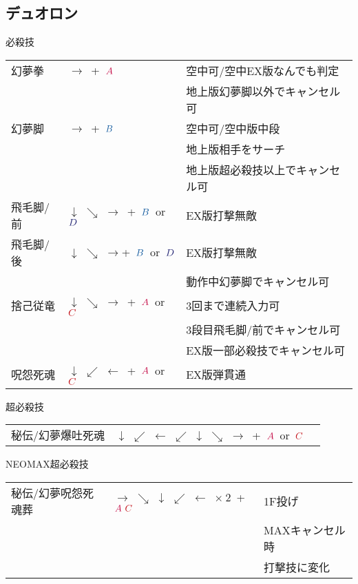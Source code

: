 \documentclass[a4j,11pt]{jarticle}
\def\A{\textcolor{Acolor}{A}}
\def\C{\textcolor{Ccolor}{C}}
\def\B{\textcolor{Bcolor}{B}}
\def\D{\textcolor{Dcolor}{D}}
\def\hado{$\downarrow$ $\searrow$ $\rightarrow$}%
\def\tatsu{$\downarrow$ $\swarrow$ $\leftarrow$}%
\def\gyakuyoga{$\rightarrow$ $\searrow$ $\downarrow$ $\swarrow$ $\leftarrow$}%
\def\orochi{$\downarrow$ $\swarrow$ $\leftarrow$ $\swarrow$ $\downarrow$ $\searrow$ $\rightarrow$}%
\begin{document}
\subsection{デュオロン}
\begin{itembox}[l]{必殺技}
\begin{tabular}{lll}
幻夢拳&$\rightarrow$\ +\ $\A$&空中可/空中EX版なんでも判定\\%
&&地上版幻夢脚以外でキャンセル可\\
幻夢脚&$\rightarrow$\ +\ $\B$&空中可/空中版中段\\%
&&地上版相手をサーチ\\
&&地上版超必殺技以上でキャンセル可\\
飛毛脚/前&\hado\ +\ $\B$\ or\ $\D$&EX版打撃無敵\\%
飛毛脚/後&\hado +\ $\B$\ or\ $\D$&EX版打撃無敵\\%
&&動作中幻夢脚でキャンセル可\\
捨己従竜&\hado\ +\ $\A$\ or\ $\C$&3回まで連続入力可\\%
&&3段目飛毛脚/前でキャンセル可\\
&&EX版一部必殺技でキャンセル可\\
呪怨死魂&\tatsu\ +\ $\A$\ or\ $\C$&EX版弾貫通%
\end{tabular}
\end{itembox}
\begin{itembox}[l]{超必殺技}
\begin{tabular}{lll}
秘伝/幻夢爆吐死魂&\orochi\ +\ $\A$\ or\ $\C$&%
\end{tabular}
\end{itembox}
\begin{itembox}[l]{NEOMAX超必殺技}
\begin{tabular}{lll}
秘伝/幻夢呪怨死魂葬&\gyakuyoga\ $\times\ 2$\ +\ $\A\ \C$&1F投げ\\%
&&MAXキャンセル時\\
&&打撃技に変化
\end{tabular}
\end{itembox}
\newpage
\end{document}
